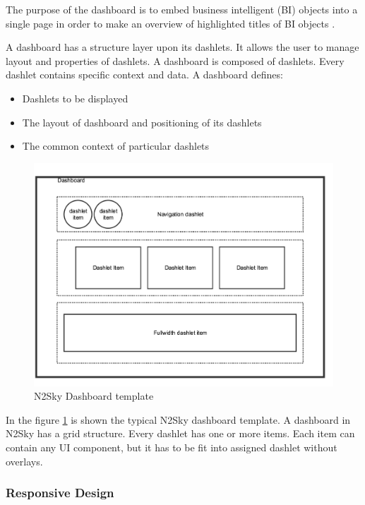 The purpose of the dashboard is to embed business intelligent (BI) objects into a single page in order to make an overview of highlighted titles of BI objects \cite{dashboards_book}.

A dashboard has a structure layer upon its dashlets. It allows the user to manage layout and properties of dashlets. A dashboard is composed of dashlets. Every dashlet contains specific context and data. A dashboard defines: 
\begin{itemize}
\item Dashlets to be displayed
\item The layout of dashboard and positioning of its dashlets
\item The common context of particular dashlets
\end{itemize}


\begin{figure}[H]
\begin{center}
  \includegraphics[width=\linewidth]{components/3/components/dashboard_template.png}
  \caption{N2Sky Dashboard template}
  \label{fig:dashboard_template}
\end{center}
\end{figure}

In the figure \ref{fig:dashboard_template} is shown the typical N2Sky dashboard template. A dashboard in N2Sky has a grid structure. Every dashlet has one or more items. Each item can contain any UI component, but it has to be fit into assigned dashlet without overlays. 



\subsubsection{Responsive Design}\label{Responsive design}

